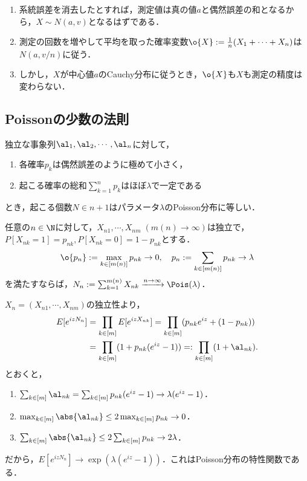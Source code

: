 \documentclass[uplatex,dvipdfmx]{jsreport}
\begin{document}
\begin{remarks}
    \begin{enumerate}
        \item 系統誤差を消去したとすれば，測定値は真の値$a$と偶然誤差の和となるから，$X\sim N(a,v)$となるはずである．
        \item 測定の回数を増やして平均を取った確率変数$\o{X}:=\frac{1}{n}(X_1+\cdots+X_n)$は$N(a,v/n)$に従う．
        \item しかし，$X$が中心値$a$のCauchy分布に従うとき，$\o{X}$も$X$も測定の精度は変わらない．
    \end{enumerate}
\end{remarks}

\subsection{Poissonの少数の法則}

\begin{tcolorbox}[colframe=ForestGreen, colback=ForestGreen!10!white,breakable,colbacktitle=ForestGreen!40!white,coltitle=black,fonttitle=\bfseries\sffamily,
title=]
    独立な事象列$\al_1,\al_2,\cdots,\al_n$に対して，
    \begin{enumerate}
        \item 各確率$p_k$は偶然誤差のように極めて小さく，
        \item 起こる確率の総和$\sum^n_{k=1}p_k$はほぼ$\lambda$で一定である
    \end{enumerate}
    とき，起こる個数$N\in n+1$はパラメータ$\lambda$のPoisson分布に等しい．
\end{tcolorbox}

\begin{theorem}
    任意の$n\in\N$に対して，$X_{n1},\cdots,X_{nm}\;(m(n)\to\infty)$は独立で，$P[X_{nk}=1]=p_{nk},P[X_{nk}=0]=1-p_{nk}$とする．
    \[\o{p_n}:=\max_{k\in [m(n)]}p_{nk}\to0,\quad p_n:=\sum_{k\in[m(n)]}p_{nk}\to\lambda\]
    を満たすならば，$N_n:=\sum_{k=1}^{m(n)}X_{nk}\xrightarrow{n\to\infty}\Pois(\lambda)$．
\end{theorem}
\begin{Proof}
    $X_n=(X_{n1},\cdots,X_{nm})$の独立性より，
    \begin{align*}
        E[e^{izN_n}]&=\prod_{k\in[m]}E[e^{izX_{nk}}]=\prod_{k\in[m]}(p_{nk}e^{iz}+(1-p_{nk}))\\
        &=\prod_{k\in[m]}(1+p_{nk}(e^{iz}-1))=:\prod_{k\in[m]}(1+\al_{nk}).
    \end{align*}
    とおくと，
    \begin{enumerate}
        \item $\sum_{k\in[m]}\al_{nk}=\sum_{k\in[m]}p_{nk}(e^{iz}-1)\to\lambda(e^{iz}-1)$．
        \item $\max_{k\in[m]}\abs{\al_{nk}}\le2\max_{k\in[m]}p_{nk}\to0$．
        \item $\sum_{k\in[m]}\abs{\al_{nk}}\le2\sum_{k\in[m]}p_{nk}\to2\lambda$．
    \end{enumerate}
    だから，$E[e^{izN_n}]\to\exp(\lambda(e^{iz}-1))$．これはPoisson分布の特性関数である．
\end{Proof}
\end{document}
